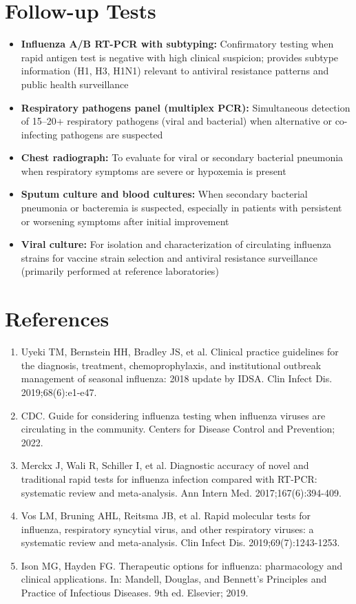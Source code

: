 \section*{Follow-up Tests}
\begin{itemize}
  \item \textbf{Influenza A/B RT-PCR with subtyping:} Confirmatory testing when rapid antigen test is negative with high clinical suspicion; provides subtype information (H1, H3, H1N1) relevant to antiviral resistance patterns and public health surveillance
  \item \textbf{Respiratory pathogens panel (multiplex PCR):} Simultaneous detection of 15--20+ respiratory pathogens (viral and bacterial) when alternative or co-infecting pathogens are suspected
  \item \textbf{Chest radiograph:} To evaluate for viral or secondary bacterial pneumonia when respiratory symptoms are severe or hypoxemia is present
  \item \textbf{Sputum culture and blood cultures:} When secondary bacterial pneumonia or bacteremia is suspected, especially in patients with persistent or worsening symptoms after initial improvement
  \item \textbf{Viral culture:} For isolation and characterization of circulating influenza strains for vaccine strain selection and antiviral resistance surveillance (primarily performed at reference laboratories)
\end{itemize}

\section*{References}
\begin{enumerate}
  \item Uyeki TM, Bernstein HH, Bradley JS, et al. Clinical practice guidelines for the diagnosis, treatment, chemoprophylaxis, and institutional outbreak management of seasonal influenza: 2018 update by IDSA. Clin Infect Dis. 2019;68(6):e1-e47.
  \item CDC. Guide for considering influenza testing when influenza viruses are circulating in the community. Centers for Disease Control and Prevention; 2022.
  \item Merckx J, Wali R, Schiller I, et al. Diagnostic accuracy of novel and traditional rapid tests for influenza infection compared with RT-PCR: systematic review and meta-analysis. Ann Intern Med. 2017;167(6):394-409.
  \item Vos LM, Bruning AHL, Reitsma JB, et al. Rapid molecular tests for influenza, respiratory syncytial virus, and other respiratory viruses: a systematic review and meta-analysis. Clin Infect Dis. 2019;69(7):1243-1253.
  \item Ison MG, Hayden FG. Therapeutic options for influenza: pharmacology and clinical applications. In: Mandell, Douglas, and Bennett's Principles and Practice of Infectious Diseases. 9th ed. Elsevier; 2019.
\end{enumerate}

\clearpage
